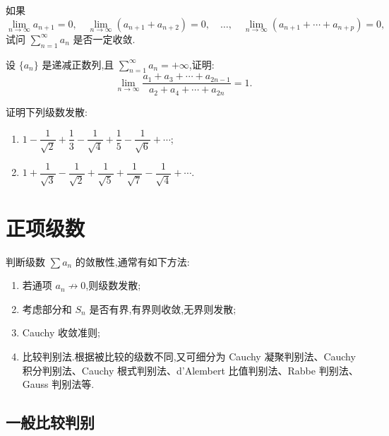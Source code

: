 \documentclass[../../数学分析培优讲义.tex]{subfiles}
\begin{document}
\begin{example}
如果
\[
    \lim\limits_{n\to\infty}a_{n+1}=0,
    \quad
    \lim\limits_{n\to\infty}(a_{n+1}+a_{n+2})=0,
    \quad\ldots,\quad
    \lim\limits_{n\to\infty}(a_{n+1}+\cdots+a_{n+p})=0,
\]
试问 $\displaystyle\sum\limits_{n=1}^{\infty}a_n$ 是否一定收敛.
\end{example}
\exampleblank

\begin{example}
设 $\{a_n\}$ 是递减正数列,且 $\displaystyle\sum\limits_{n=1}^{\infty}a_n=+\infty$,证明:
\[
    \lim\limits_{n\to\infty}
    \dfrac{a_1+a_3+\cdots+a_{2n-1}}{a_2+a_4+\cdots+a_{2n}}=1.
\]
\end{example}
\exampleblank

\begin{example}
证明下列级数发散:
\begin{enumerate}[label=(\arabic*)]
    \item $\displaystyle1-\dfrac{1}{\sqrt2}+\dfrac{1}{3}-\dfrac{1}{\sqrt4}+\dfrac{1}{5}-\dfrac{1}{\sqrt6}+\cdots$;
    \item $\displaystyle1+\dfrac{1}{\sqrt3}-\dfrac{1}{\sqrt2}+\dfrac{1}{\sqrt5}+\dfrac{1}{\sqrt7}-\dfrac{1}{\sqrt4}+\cdots$.
\end{enumerate}
\end{example}
\exampleblank


\newpage

\section{正项级数}

判断级数 $\displaystyle\sum a_n$ 的敛散性,通常有如下方法:
\begin{enumerate}[label=\textcircled{\arabic*}]
    \item 若通项 $a_n\not\to0$,则级数发散;
    \item 考虑部分和 $S_n$ 是否有界,有界则收敛,无界则发散;
    \item Cauchy 收敛准则;
    \item 比较判别法.根据被比较的级数不同,又可细分为 Cauchy 凝聚判别法、Cauchy 积分判别法、Cauchy 根式判别法、d'Alembert 比值判别法、Rabbe 判别法、Gauss 判别法等.
\end{enumerate}



\subsection{一般比较判别}
\end{document}
